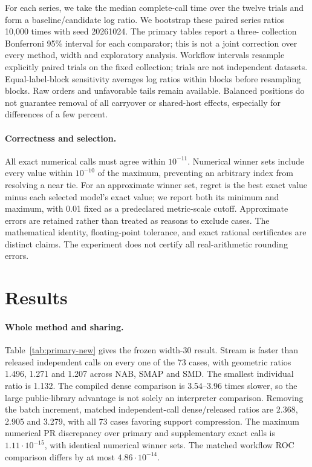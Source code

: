 For each series, we take the median complete-call time over the twelve trials
and form a baseline/candidate log ratio. We bootstrap these paired series
ratios 10,000 times with seed 20261024. The primary tables report a three-
collection Bonferroni 95\% interval for each comparator; this is not a joint
correction over every method, width and exploratory analysis. Workflow intervals
resample explicitly paired trials on the fixed collection; trials are not
independent datasets. Equal-label-block sensitivity averages log ratios within
blocks before resampling blocks. Raw orders and unfavorable tails remain
available. Balanced positions do not guarantee removal of all carryover or
shared-host effects, especially for differences of a few percent.

\paragraph{Correctness and selection.}
All exact numerical calls must agree within $10^{-11}$. Numerical winner sets
include every value within $10^{-10}$ of the maximum, preventing an arbitrary
index from resolving a near tie. For an approximate winner set, regret is the
best exact value minus each selected model's exact value; we report both its
minimum and maximum, with 0.01 fixed as a predeclared metric-scale cutoff. Approximate
errors are retained rather than treated as reasons to exclude cases. The
mathematical identity, floating-point tolerance, and exact rational certificates
are distinct claims. The experiment does not certify all real-arithmetic
rounding errors.

\section{Results}

\paragraph{Whole method and sharing.}
Table~\ref{tab:primary-new} gives the frozen width-30 result. Stream is faster
than released independent calls on every one of the 73 cases, with geometric
ratios 1.496, 1.271 and 1.207 across NAB, SMAP and SMD. The smallest individual
ratio is 1.132. The compiled dense comparison is 3.54--3.96 times slower, so the
large public-library advantage is not solely an interpreter comparison.
Removing the batch increment, matched independent-call dense/released ratios
are 2.368, 2.905 and 3.279, with all 73 cases favoring support compression. The
maximum numerical PR discrepancy over primary and supplementary exact calls
is $1.11\cdot10^{-15}$, with identical numerical winner sets. The matched
workflow ROC comparison differs by at most $4.86\cdot10^{-14}$.

